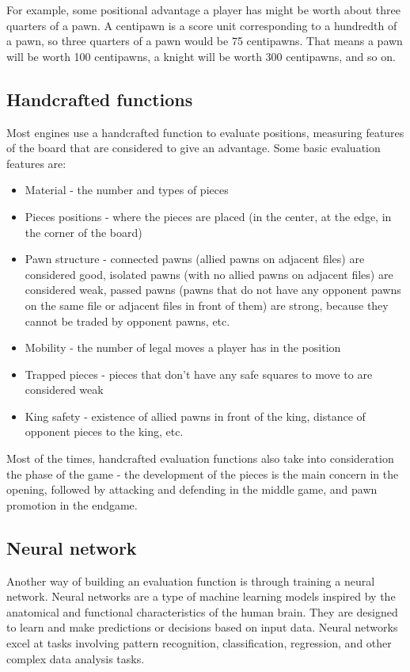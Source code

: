For example, some positional advantage a player has might be worth about three quarters of a pawn. A centipawn is a score unit corresponding to a hundredth of a pawn, so three quarters of a pawn would be 75 centipawns. That means a pawn will be worth 100 centipawns, a knight will be worth 300 centipawns, and so on.

\subsection{Handcrafted functions}
\label{subsec:ch2sec3subsec2}

Most engines use a handcrafted function to evaluate positions, measuring features of the board that are considered to give an advantage. Some basic evaluation features are:
\begin{itemize}
    \item Material - the number and types of pieces
    \item Pieces positions - where the pieces are placed (in the center, at the edge, in the corner of the board)
    \item Pawn structure - connected pawns (allied pawns on adjacent files) are considered good, isolated pawns (with no allied pawns on adjacent files) are considered weak, passed pawns (pawns that do not have any opponent pawns on the same file or adjacent files in front of them) are strong, because they cannot be traded by opponent pawns, etc.
    \item Mobility - the number of legal moves a player has in the position
    \item Trapped pieces - pieces that don't have any safe squares to move to are considered weak
    \item King safety - existence of allied pawns in front of the king, distance of opponent pieces to the king, etc.
\end{itemize}

Most of the times, handcrafted evaluation functions also take into consideration the phase of the game - the development of the pieces is the main concern in the opening, followed by attacking and defending in the middle game, and pawn promotion in the endgame.

\subsection{Neural network}
\label{subsec:ch2sec3subsec3}

Another way of building an evaluation function is through training a neural network. Neural networks are a type of machine learning models inspired by the anatomical and functional characteristics of the human brain. They are designed to learn and make predictions or decisions based on input data. Neural networks excel at tasks involving pattern recognition, classification, regression, and other complex data analysis tasks.

